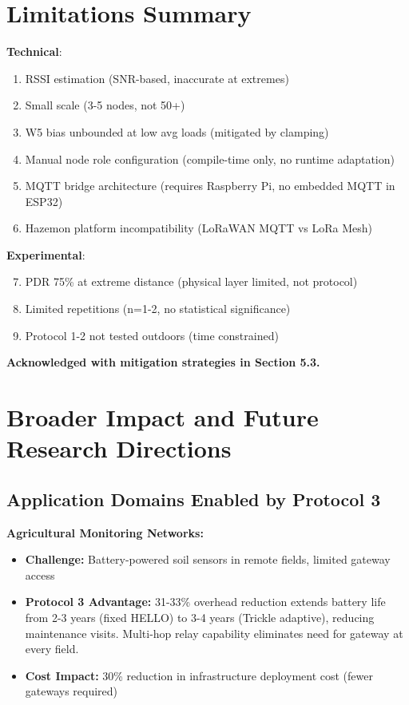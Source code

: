 \section{Limitations Summary}

\textbf{Technical}:
\begin{enumerate}
\item RSSI estimation (SNR-based, inaccurate at extremes)
\item Small scale (3-5 nodes, not 50+)
\item W5 bias unbounded at low avg loads (mitigated by clamping)
\item Manual node role configuration (compile-time only, no runtime adaptation)
\item MQTT bridge architecture (requires Raspberry Pi, no embedded MQTT in ESP32)
\item Hazemon platform incompatibility (LoRaWAN MQTT vs LoRa Mesh)
\end{enumerate}

\textbf{Experimental}:
\begin{enumerate}
\setcounter{enumi}{6}
\item PDR 75\% at extreme distance (physical layer limited, not protocol)
\item Limited repetitions (n=1-2, no statistical significance)
\item Protocol 1-2 not tested outdoors (time constrained)
\end{enumerate}

\textbf{Acknowledged with mitigation strategies in Section 5.3.}

\section{Broader Impact and Future Research Directions}

\subsection{Application Domains Enabled by Protocol 3}

\textbf{Agricultural Monitoring Networks:}
\begin{itemize}
\item \textbf{Challenge:} Battery-powered soil sensors in remote fields, limited gateway access
\item \textbf{Protocol 3 Advantage:} 31-33\% overhead reduction extends battery life from 2-3 years (fixed HELLO) to 3-4 years (Trickle adaptive), reducing maintenance visits. Multi-hop relay capability eliminates need for gateway at every field.
\item \textbf{Cost Impact:} 30\% reduction in infrastructure deployment cost (fewer gateways required)
\end{itemize}

